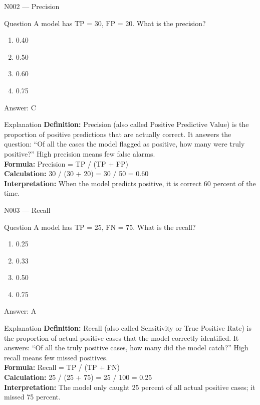 \documentclass[aspectratio=169,8pt]{beamer}
\begin{document}
	\begin{frame}{N002 --- Precision}
		\begin{block}{Question}
			A model has TP = 30, FP = 20. What is the precision?
			\begin{enumerate}
				\item 0.40
				\item 0.50
				\item 0.60
				\item 0.75
			\end{enumerate}
		\end{block}
		\begin{exampleblock}{Answer: C}\end{exampleblock}
		\begin{block}{Explanation}
			\textbf{Definition:} Precision (also called Positive Predictive Value) is the proportion of positive predictions that are actually correct. It answers the question: ``Of all the cases the model flagged as positive, how many were truly positive?'' High precision means few false alarms.\\
			\textbf{Formula:} Precision = TP / (TP + FP)\\
			\textbf{Calculation:} 30 / (30 + 20) = 30 / 50 = 0.60\\
			\textbf{Interpretation:} When the model predicts positive, it is correct 60 percent of the time.
		\end{block}
	\end{frame}
	
	\begin{frame}{N003 --- Recall}
		\begin{block}{Question}
			A model has TP = 25, FN = 75. What is the recall?
			\begin{enumerate}
				\item 0.25
				\item 0.33
				\item 0.50
				\item 0.75
			\end{enumerate}
		\end{block}
		\begin{exampleblock}{Answer: A}\end{exampleblock}
		\begin{block}{Explanation}
			\textbf{Definition:} Recall (also called Sensitivity or True Positive Rate) is the proportion of actual positive cases that the model correctly identified. It answers: ``Of all the truly positive cases, how many did the model catch?'' High recall means few missed positives.\\
			\textbf{Formula:} Recall = TP / (TP + FN)\\
			\textbf{Calculation:} 25 / (25 + 75) = 25 / 100 = 0.25\\
			\textbf{Interpretation:} The model only caught 25 percent of all actual positive cases; it missed 75 percent.
		\end{block}
	\end{frame}
	
\end{document}
